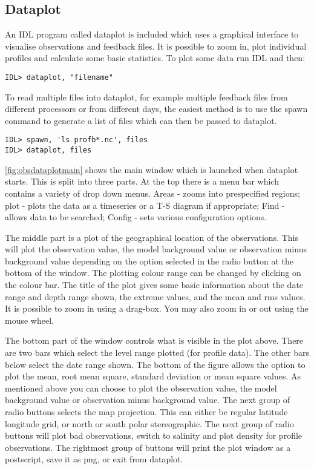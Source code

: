 \documentclass[../tex_main/NEMO_manual]{subfiles}
\begin{document}
\subsection{Dataplot}

An IDL program called dataplot is included which uses a graphical interface to
visualise observations and feedback files.
It is possible to zoom in, plot individual profiles and calculate some basic statistics.
To plot some data run IDL and then:
\footnotesize
\begin{verbatim}
IDL> dataplot, "filename"
\end{verbatim}

To read multiple files into dataplot,
for example multiple feedback files from different processors or from different days,
the easiest method is to use the spawn command to generate a list of files which can then be passed to dataplot.
\footnotesize
\begin{verbatim}
IDL> spawn, 'ls profb*.nc', files
IDL> dataplot, files
\end{verbatim}

\autoref{fig:obsdataplotmain} shows the main window which is launched when dataplot starts.
This is split into three parts.
At the top there is a menu bar which contains a variety of drop down menus.
Areas - zooms into prespecified regions;
plot - plots the data as a timeseries or a T-S diagram if appropriate;
Find - allows data to be searched;
Config - sets various configuration options.

The middle part is a plot of the geographical location of the observations.
This will plot the observation value, the model background value or observation minus background value depending on
the option selected in the radio button at the bottom of the window.
The plotting colour range can be changed by clicking on the colour bar.
The title of the plot gives some basic information about the date range and depth range shown,
the extreme values, and the mean and rms values.
It is possible to zoom in using a drag-box.
You may also zoom in or out using the mouse wheel.

The bottom part of the window controls what is visible in the plot above.
There are two bars which select the level range plotted (for profile data).
The other bars below select the date range shown.
The bottom of the figure allows the option to plot the mean, root mean square, standard deviation or
mean square values.
As mentioned above you can choose to plot the observation value, the model background value or
observation minus background value.
The next group of radio buttons selects the map projection.
This can either be regular latitude longitude grid, or north or south polar stereographic.
The next group of radio buttons will plot bad observations, switch to salinity and
plot density for profile observations.
The rightmost group of buttons will print the plot window as a postscript, save it as png, or exit from dataplot.
\end{document}
